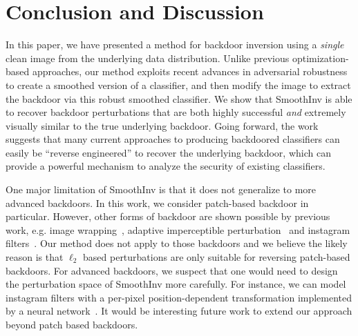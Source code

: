 \documentclass[10pt,twocolumn,letterpaper]{article}
\begin{document}
\begin{table}[t!]
\centering 
\Large 
{}
\caption{Effect of training-time intervention on backdoor attacks.}
\label{table:train_intervention}
\end{table}

\section{Conclusion and Discussion}
In this paper, we have presented a method for backdoor inversion using a \emph{single} clean image from the underlying data distribution.  Unlike previous optimization-based approaches, our method exploits recent advances in adversarial robustness to create a smoothed version of a classifier, and then modify the image to extract the backdoor via this robust smoothed classifier.  We show that SmoothInv is able to recover backdoor perturbations that are both highly successful \emph{and} extremely visually similar to the true underlying backdoor.  Going forward, the work suggests that many current approaches to producing backdoored classifiers can easily be ``reverse engineered'' to recover the underlying backdoor, which can provide a powerful mechanism to analyze the security of existing classifiers. 


One major limitation of SmoothInv is that it does not generalize to more advanced backdoors. In this work, we consider patch-based backdoor in particular. However, other forms of backdoor are shown possible by previous work, e.g. image wrapping~\cite{wanet2021nguyen}, adaptive imperceptible perturbation~\cite{Zhao_2022_CVPR} and instagram filters~\cite{darpa2021trojai}. Our method does not apply to those backdoors and we believe the likely reason is that $\ell_{2}$ based perturbations are only suitable for reversing patch-based backdoors. For advanced backdoors, we suspect that one would need to design the perturbation space of SmoothInv more carefully. For instance, we can model instagram filters with a per-pixel position-dependent transformation implemented by a neural network~\cite{hu2022topo}. It would be interesting future work to extend our approach beyond patch based backdoors.
\end{document}

